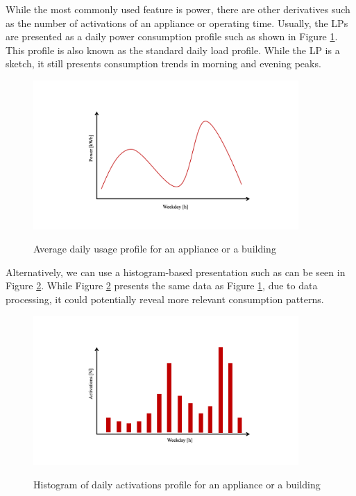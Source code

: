 While the most commonly used feature is power, there are other derivatives such as the number of activations of an appliance or operating time.
Usually, the LPs are presented as a daily power consumption profile such as shown in Figure \ref{fig:daily_power_profile}. 
This profile is also known as the standard daily load profile. 
While the LP is a sketch, it still presents consumption trends in morning and evening peaks.

\begin{figure}[H]
	\centering
	\caption{Average daily usage profile for an appliance or a building}
	\includegraphics[width=0.9\textwidth]{Figures/profile_sketches/Slide1.png}
	\label{fig:daily_power_profile}
\end{figure}

Alternatively, we can use a histogram-based presentation such as can be seen in Figure \ref{fig:daily_act_profile}.
While Figure \ref{fig:daily_act_profile} presents the same data as Figure \ref{fig:daily_power_profile},
due to data processing, it could potentially reveal more relevant consumption patterns.

\begin{figure}[H]
	\centering
	\caption{Histogram of daily activations profile for an appliance or a building}
	\includegraphics[width=0.9\textwidth]{Figures/profile_sketches/Slide5.png}
	\label{fig:daily_act_profile}
\end{figure}

